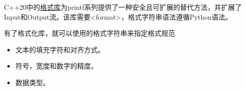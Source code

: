 
C++20中的\href{https://en.cppreference.com/w/cpp/utility/format}{格式库}为printf系列提供了一种安全且可扩展的替代方法，并扩展了Input和Output流。该库需要<format>，格式字符串语法遵循Python语法。

有了格式化库，就可以使用的格式字符串来指定格式规范

\begin{itemize}
\item 
文本的填充字符和对齐方式。

\item 
符号，宽度和数字的精度。

\item 
数据类型。
\end{itemize}



















